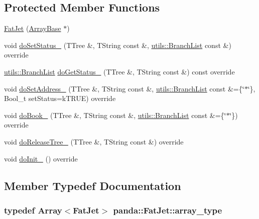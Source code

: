 \subsection*{Protected Member Functions}
\begin{DoxyCompactItemize}
\item 
\hyperlink{classpanda_1_1FatJet_a1b07ce37adb0afee46d0b0f76410db5b}{FatJet} (\hyperlink{classpanda_1_1ArrayBase}{ArrayBase} $\ast$)
\item 
void \hyperlink{classpanda_1_1FatJet_ad63603b0bd69d4e3b6173a194b3e6829}{doSetStatus\_\-} (TTree \&, TString const \&, \hyperlink{classpanda_1_1utils_1_1BranchList}{utils::BranchList} const \&) override
\item 
\hyperlink{classpanda_1_1utils_1_1BranchList}{utils::BranchList} \hyperlink{classpanda_1_1FatJet_a96835f1d5e56985c033cc73029dccef0}{doGetStatus\_\-} (TTree \&, TString const \&) const override
\item 
void \hyperlink{classpanda_1_1FatJet_a3f92ff4d7d7bb8f83fa43e4ef20bc036}{doSetAddress\_\-} (TTree \&, TString const \&, \hyperlink{classpanda_1_1utils_1_1BranchList}{utils::BranchList} const \&=\{\char`\"{}$\ast$\char`\"{}\}, Bool\_\-t setStatus=kTRUE) override
\item 
void \hyperlink{classpanda_1_1FatJet_a32dbcd6e7cf31c79aed92220c43daed7}{doBook\_\-} (TTree \&, TString const \&, \hyperlink{classpanda_1_1utils_1_1BranchList}{utils::BranchList} const \&=\{\char`\"{}$\ast$\char`\"{}\}) override
\item 
void \hyperlink{classpanda_1_1FatJet_a8a4681a9c643494786d131103f281aa8}{doReleaseTree\_\-} (TTree \&, TString const \&) override
\item 
void \hyperlink{classpanda_1_1FatJet_aae0c0b4e50cf6aae1d6c12b31d8585d9}{doInit\_\-} () override
\end{DoxyCompactItemize}


\subsection{Member Typedef Documentation}
\hypertarget{classpanda_1_1FatJet_af8c5781a44a91eb012c01dde2a710039}{
\subsubsection[{array\_\-type}]{\setlength{\rightskip}{0pt plus 5cm}typedef {\bf Array}$<${\bf FatJet}$>$ {\bf panda::FatJet::array\_\-type}}}
\label{classpanda_1_1FatJet_af8c5781a44a91eb012c01dde2a710039}


